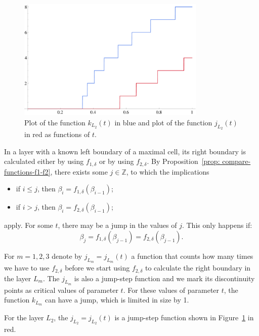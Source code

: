 \begin{figure}
\begin{center}
\includegraphics[width=0.8\textwidth]{./figures/plot-kL2-jL2-large.pdf}
\end{center}
\caption{Plot of the function $k_{L_{2}}(t)$ in blue and plot of the function $j_{L_{2}}(t)$ in red as functions of $t$.}
\label{fig: left-triangle-layers-estimates}
\end{figure}

In a layer with a known left boundary of a maximal cell, its right boundary is calculated either by using $f_{1,\delta}$ or by using $f_{2, \delta}$. By Proposition~\ref{prop: compare-functions-f1-f2}, there exists some $j \in \mathbb{Z}$, to which the implications
\begin{itemize}
  \item if $i \leq j$, then $\beta_{i} = f_{1,\delta}(\beta_{i-1})$;
  \item if $i > j$, then $\beta_{i} = f_{2,\delta}(\beta_{i-1})$;
\end{itemize}
apply. For some $t$, there may be a jump in the values of $j$. This only happens if:
$$
\beta_{j} = f_{1,\delta}(\beta_{j-1}) = f_{2,\delta}(\beta_{j-1}).
$$

For $m=1,2,3$ denote by $j_{L_{m}} = j_{L_{m}}(t)$ a function that counts how many times we have to use $f_{2, \delta}$ before we start using $f_{2, \delta}$ to calculate the right boundary in the layer $L_{m}$. The $j_{L_{m}}$ is also a jump-step function and we mark its discontinuity points as critical values of parameter $t$. For these values of parameter $t$, the function $k_{L_{m}}$ can have a jump, which is limited in size by 1.

For the layer $L_{2}$, the $j_{L_{2}} = j_{L_{2}}(t)$ is a jump-step function shown in Figure~\ref{fig: left-triangle-layers-estimates} in red.

